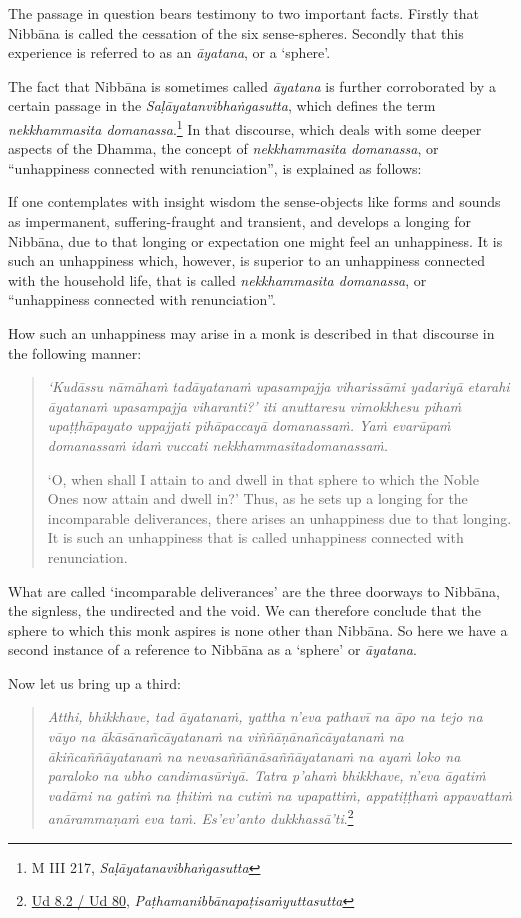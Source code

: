 The passage in question bears testimony to two important facts. Firstly that Nibbāna is called the cessation of the six sense-spheres. Secondly that this experience is referred to as an \emph{āyatana}, or a `sphere'.

The fact that Nibbāna is sometimes called \emph{āyatana} is further corroborated by a certain passage in the \emph{Saḷāyatanvibhaṅgasutta}, which defines the term \emph{nekkhammasita domanassa}.\footnote{M III 217, \emph{Saḷāyatanavibhaṅgasutta}} In that discourse, which deals with some deeper aspects of the Dhamma, the concept of \emph{nekkhammasita domanassa}, or ``unhappiness connected with renunciation'', is explained as follows:

If one contemplates with insight wisdom the sense-objects like forms and sounds as impermanent, suffering-fraught and transient, and develops a longing for Nibbāna, due to that longing or expectation one might feel an unhappiness. It is such an unhappiness which, however, is superior to an unhappiness connected with the household life, that is called \emph{nekkhammasita domanassa}, or ``unhappiness connected with renunciation''.

How such an unhappiness may arise in a monk is described in that discourse in the following manner:

\begin{quote}
\emph{`Kudāssu nāmāhaṁ tadāyatanaṁ upasampajja viharissāmi yadariyā etarahi āyatanaṁ upasampajja viharanti?' iti anuttaresu vimokkhesu pihaṁ upaṭṭhāpayato uppajjati pihāpaccayā domanassaṁ. Yaṁ evarūpaṁ domanassaṁ idaṁ vuccati nekkhammasitadomanassaṁ.}

`O, when shall I attain to and dwell in that sphere to which the Noble Ones now attain and dwell in?' Thus, as he sets up a longing for the incomparable deliverances, there arises an unhappiness due to that longing. It is such an unhappiness that is called unhappiness connected with renunciation.
\end{quote}

What are called `incomparable deliverances' are the three doorways to Nibbāna, the signless, the undirected and the void. We can therefore conclude that the sphere to which this monk aspires is none other than Nibbāna. So here we have a second instance of a reference to Nibbāna as a `sphere' or \emph{āyatana}.

Now let us bring up a third:

\begin{quote}
\emph{Atthi, bhikkhave, tad āyatanaṁ, yattha n'eva pathavī na āpo na tejo na vāyo na ākāsānañcāyatanaṁ na viññāṇānañcāyatanaṁ na ākiñcaññāyatanaṁ na nevasaññānāsaññāyatanaṁ na ayaṁ loko na paraloko na ubho candimasūriyā. Tatra p'ahaṁ bhikkhave, n'eva āgatiṁ vadāmi na gatiṁ na ṭhitiṁ na cutiṁ na upapattiṁ, appatiṭṭhaṁ appavattaṁ anārammaṇaṁ eva taṁ. Es'ev'anto dukkhassā'ti}.\footnote{\href{https://suttacentral.net/ud8.2/pli/ms}{Ud 8.2 / Ud 80}, \emph{Paṭhamanibbānapaṭisaṁyuttasutta}}
\end{quote}

